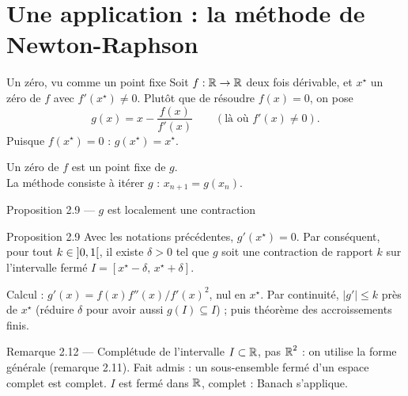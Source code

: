 \section{Une application : la méthode de Newton-Raphson}

\begin{frame}{Un zéro, vu comme un point fixe}
  \small Soit $f:\operatorname{\mathbb{R}}\to\operatorname{\mathbb{R}}$ deux fois dérivable, et $x^\star$ un zéro de
  $f$ avec $f'(x^\star)\neq0$. Plutôt que de résoudre $f(x)=0$, on pose
  \[
    g(x) = x - \frac{f(x)}{f'(x)}\qquad(\text{là où } f'(x)\neq0).
  \]
  Puisque $f(x^\star)=0$ : $g(x^\star)=x^\star$.
  \vspace{4pt}
  \begin{center}
    Un zéro de $f$ est un point fixe de $g$.\\[2pt]
    La méthode consiste à itérer $g$ : $x_{n+1}=g(x_n)$.
  \end{center}
\end{frame}

\begin{frame}{Proposition 2.9 --- $g$ est localement une contraction}
  \begin{Enonce}{Proposition 2.9}
    \small Avec les notations précédentes, $g'(x^\star)=0$. Par
    conséquent, pour tout $k\in\mathopen{]}{0},{1}\mathclose{[}$, il existe $\delta>0$ tel que
    $g$ soit une contraction de rapport $k$ sur l'intervalle fermé
    $I=[x^\star-\delta,\,x^\star+\delta]$.
  \end{Enonce}
  \begin{AuTableau}
    \footnotesize Calcul : $g'(x) = f(x)f''(x)/f'(x)^2$, nul en $x^\star$.
    Par continuité, $|g'|\leq k$ près de $x^\star$ (réduire $\delta$
    pour avoir aussi $g(I)\subseteq I$) ; puis théorème des
    accroissements finis.
  \end{AuTableau}
  \begin{Rem}{Remarque 2.12 --- Complétude de l'intervalle}
    \footnotesize $I\subset\operatorname{\mathbb{R}}$, pas $\operatorname{\mathbb{R}}^2$ : on utilise la forme
    générale (remarque 2.11). Fait admis : un sous-ensemble
    fermé d'un espace complet est complet. $I$ est fermé dans
    $\operatorname{\mathbb{R}}$, complet : Banach s'applique.
  \end{Rem}
\end{frame}

